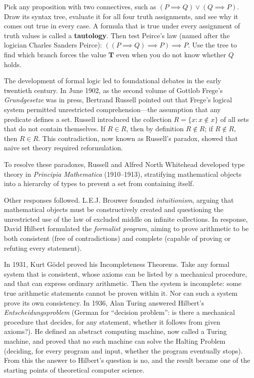 \begin{labbox}
Pick any proposition with two connectives, such as $(P \implies Q) \lor (Q \implies P)$. Draw its syntax tree, evaluate it for all four truth assignments, and see why it comes out true in every case. A formula that is true under every assignment of truth values is called a \textbf{tautology}. Then test Peirce's law (named after the logician Charles Sanders Peirce): $((P \implies Q) \implies P) \implies P$. Use the tree to find which branch forces the value $\mathbf{T}$ even when you do not know whether $Q$ holds.
\end{labbox}

\begin{historybox}
The development of formal logic led to foundational debates in the early twentieth century. In June 1902, as the second volume of Gottlob Frege's \emph{Grundgesetze} was in press, Bertrand Russell pointed out that Frege's logical system permitted unrestricted comprehension---the assumption that any predicate defines a set. Russell introduced the collection $R = \{x : x \notin x\}$ of all sets that do not contain themselves. If $R \in R$, then by definition $R \notin R$; if $R \notin R$, then $R \in R$. This contradiction, now known as Russell's paradox, showed that naive set theory required reformulation.

To resolve these paradoxes, Russell and Alfred North Whitehead developed type theory in \emph{Principia Mathematica} (1910--1913), stratifying mathematical objects into a hierarchy of types to prevent a set from containing itself.

Other responses followed. L.E.J. Brouwer founded \emph{intuitionism}, arguing that mathematical objects must be constructively created and questioning the unrestricted use of the law of excluded middle on infinite collections. In response, David Hilbert formulated the \emph{formalist program}, aiming to prove arithmetic to be both consistent (free of contradictions) and complete (capable of proving or refuting every statement).

In 1931, Kurt G\"odel proved his Incompleteness Theorems. Take any formal system that is consistent, whose axioms can be listed by a mechanical procedure, and that can express ordinary arithmetic. Then the system is incomplete: some true arithmetic statements cannot be proven within it. Nor can such a system prove its own consistency. In 1936, Alan Turing answered Hilbert's \emph{Entscheidungsproblem} (German for ``decision problem'': is there a mechanical procedure that decides, for any statement, whether it follows from given axioms?). He defined an abstract computing machine, now called a Turing machine, and proved that no such machine can solve the Halting Problem (deciding, for every program and input, whether the program eventually stops). From this the answer to Hilbert's question is no, and the result became one of the starting points of theoretical computer science.


\end{historybox}
